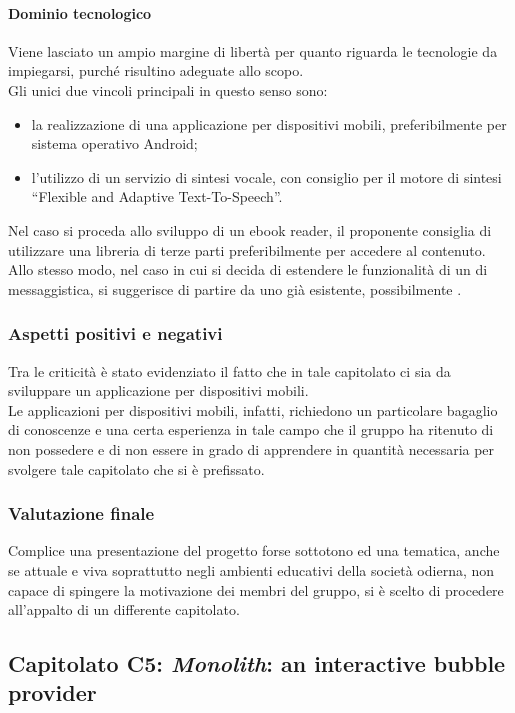 			\paragraph{Dominio tecnologico}
			Viene lasciato un ampio margine di libertà per quanto riguarda le tecnologie da impiegarsi, purché risultino adeguate allo scopo. 
			\\Gli unici due vincoli principali in questo senso sono:
			\begin{itemize}
			\item la realizzazione di una applicazione per dispositivi mobili, preferibilmente per sistema operativo Android;
			\item l'utilizzo di un servizio di sintesi vocale, con consiglio per il motore di sintesi “Flexible and Adaptive Text-To-Speech”.
			\end{itemize}
			Nel caso si proceda allo sviluppo di un ebook reader, il proponente consiglia di utilizzare una libreria di terze parti preferibilmente 
			 per accedere al contenuto. Allo stesso modo, nel caso in cui si decida di estendere le funzionalità di un  di messaggistica, 
			si suggerisce di partire da uno già esistente, possibilmente .
		\subsubsection{Aspetti positivi e negativi}
		Tra le criticità è stato evidenziato il fatto che in tale capitolato ci sia da sviluppare un applicazione per dispositivi mobili.
		\\Le applicazioni per dispositivi mobili, infatti, richiedono un particolare bagaglio di conoscenze e una certa esperienza in tale campo che
		il gruppo ha ritenuto di non possedere e di non essere in grado di apprendere in quantità necessaria per svolgere tale capitolato che si è prefissato.
		
		\subsubsection{Valutazione finale}
		Complice una presentazione del progetto forse sottotono ed una tematica, anche se attuale e viva soprattutto negli ambienti 
		educativi della società odierna, non capace di spingere la motivazione dei membri del gruppo, si è scelto di procedere all'appalto di un 
		differente capitolato.
		
	\subsection{Capitolato C5: \emph{Monolith}: an interactive bubble provider}
